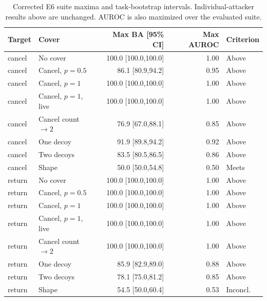\begin{table}[!ht]\centering\scriptsize
\caption{Corrected E6 suite maxima and task-bootstrap intervals. Individual-attacker results above are unchanged. AUROC is also maximized over the evaluated suite.}
\begin{tabular}{@{}llrrl@{}}\toprule
Target & Cover & Max BA [95\% CI] & Max AUROC & Criterion\\\midrule
cancel & No cover & 100.0 [100.0,100.0] & 1.00 & Above\\
cancel & Cancel, $p{=}0.5$ & 86.1 [80.9,94.2] & 0.95 & Above\\
cancel & Cancel, $p{=}1$ & 100.0 [100.0,100.0] & 1.00 & Above\\
cancel & Cancel, $p{=}1$, live & 100.0 [100.0,100.0] & 1.00 & Above\\
cancel & Cancel count $\to2$ & 76.9 [67.0,88.1] & 0.85 & Above\\
cancel & One decoy & 91.9 [89.8,94.2] & 0.92 & Above\\
cancel & Two decoys & 83.5 [80.5,86.5] & 0.86 & Above\\
cancel & Shape & 50.0 [50.0,54.8] & 0.50 & Meets\\
return & No cover & 100.0 [100.0,100.0] & 1.00 & Above\\
return & Cancel, $p{=}0.5$ & 100.0 [100.0,100.0] & 1.00 & Above\\
return & Cancel, $p{=}1$ & 100.0 [100.0,100.0] & 1.00 & Above\\
return & Cancel, $p{=}1$, live & 100.0 [100.0,100.0] & 1.00 & Above\\
return & Cancel count $\to2$ & 100.0 [100.0,100.0] & 1.00 & Above\\
return & One decoy & 85.9 [82.9,89.0] & 0.88 & Above\\
return & Two decoys & 78.1 [75.0,81.2] & 0.85 & Above\\
return & Shape & 54.5 [50.0,60.4] & 0.53 & Inconcl.\\
\bottomrule\end{tabular}\end{table}

